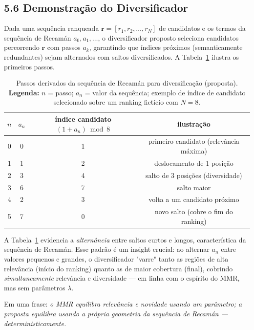 \subsection*{5.6 Demonstração do Diversificador}

 Dada uma sequência ranqueada $\mathbf{r} = [r_1, r_2, \dots, r_N]$ de
candidatos e os termos da sequência de Recamán $a_0, a_1, \dots$, o diversificador
proposto seleciona candidatos percorrendo $\mathbf{r}$ com passos $a_k$, garantindo
que índices próximos (semanticamente redundantes) sejam alternados com saltos
diversificados. A Tabela~\ref{tab:offsets} ilustra os primeiros passos.

\begin{table}[!htb]
\centering
\caption{Passos derivados da sequência de Recamán para diversificação (proposta).
\textbf{Legenda:} $n$ = passo; $a_n$ = valor da sequência; exemplo de índice de
candidato selecionado sobre um ranking fictício com $N=8$.}
\label{tab:offsets}
\begin{tabular}{cccc}
\toprule
$n$ & $a_n$ & índice candidato $(1\!+\!a_n) \bmod 8$ & ilustração \\
\midrule
0 & 0 & 1 & primeiro candidato (relevância máxima) \\
1 & 1 & 2 & deslocamento de 1 posição \\
2 & 3 & 4 & salto de 3 posições (diversidade) \\
3 & 6 & 7 & salto maior \\
4 & 2 & 3 & volta a um candidato próximo \\
5 & 7 & 0 & novo salto (cobre o fim do ranking) \\
\bottomrule
\end{tabular}
\end{table}

 A Tabela~\ref{tab:offsets} evidencia a \emph{alternância} entre saltos
curtos e longos, característica da sequência de Recamán. Esse padrão é um insight
crucial: ao alternar $a_n$ entre valores pequenos e grandes, o diversificador
"varre" tanto as regiões de alta relevância (início do ranking) quanto as de maior
cobertura (final), cobrindo \emph{simultaneamente} relevância e diversidade --- em
linha com o espírito do MMR, mas sem parâmetros $\lambda$.

\begin{pontochave}
Em uma frase: \emph{o MMR equilibra relevância e novidade usando um parâmetro; a
proposta equilibra usando a própria geometria da sequência de Recamán ---
deterministicamente.}
\end{pontochave}
